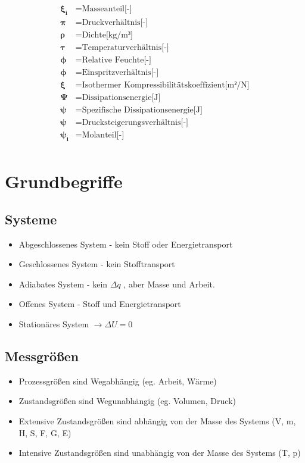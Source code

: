 \documentclass[twocolumn]{article}
\begin{document}
\begin{align*}
	\mathbf{\xi_i}		&=	\text{Masseanteil[-]} \\
	\mathbf{\pi}		&=	\text{Druckverhältnis[-]} \\
	\mathbf{\rho}		&=	\text{Dichte[kg/m³]} \\
	\mathbf{\tau}		&=	\text{Temperaturverhältnis[-]} \\
	\mathbf{\phi}		&=	\text{Relative Feuchte[-]} \\
	\mathbf{\phi}		&=	\text{Einspritzverhältnis[-]} \\
	\mathbf{\xi}		&=	\text{Isothermer Kompressibilitätskoeffizient[m²/N]} \\
	\mathbf{\Psi}		&=	\text{Dissipationsenergie[J]} \\
	\mathbf{\psi}		&=	\text{Spezifische Dissipationsenergie[J]} \\
	\mathbf{\psi}		&=	\text{Drucksteigerungsverhältnis[-]} \\
	\mathbf{\psi_i}		&=	\text{Molanteil[-]} \\
\end{align*}

\pagebreak 

\section{Grundbegriffe}
\subsection*{Systeme}
\begin{itemize}
	\item Abgeschlossenes System - kein Stoff oder Energietransport
	\item Geschlossenes System - kein Stofftransport
	\item Adiabates System - kein $\Delta q$ , aber Masse und Arbeit.
	\item Offenes System - Stoff und Energietransport
	\item Stationäres System $\rightarrow \Delta U = 0$
\end{itemize}

\subsection*{Messgrößen}
\begin{itemize}
	\item Prozessgrößen sind Wegabhängig (eg. Arbeit, Wärme)
	\item Zustandsgrößen sind Wegunabhängig (eg. Volumen, Druck)
	\item Extensive Zustandsgrößen sind abhängig von der Masse des Systems (V, m, H, S, F, G, E)
	\item Intensive Zustandsgrößen sind unabhängig von der Masse des Systems (T, p)
\end{itemize}
\end{document}
